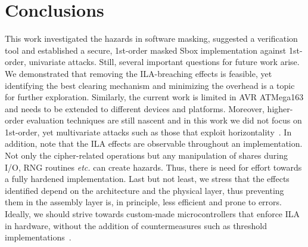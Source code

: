 \section{Conclusions} \label{sec:conclusions}

This work investigated the hazards in software masking, 
suggested a verification tool and established a secure, 
1st-order masked Sbox implementation against 1st-order, univariate attacks. 
Still, several important questions for future work arise. 
We demonstrated that removing the ILA-breaching effects is feasible, 
yet identifying the best clearing mechanism and minimizing the overhead is a topic for further exploration. 
Similarly, the current work is limited in AVR ATMega163 and needs to be 
extended to different devices and platforms. Moreover, higher-order evaluation 
techniques are still nascent and in this work we did not focus on 1st-order, 
yet multivariate attacks such as those that exploit horizontality~\cite{DBLP:conf/ches/BattistelloCPZ16}. 
In addition, note that the ILA effects are observable throughout an implementation. 
Not only the cipher-related operations but any manipulation of shares during I/O, RNG routines \emph{etc.} 
can create hazards. Thus, there is need for effort towards a fully hardened implementation. 
Last but not least, we stress that the effects identified depend on the architecture and the physical layer, 
thus preventing them in the assembly layer is, in principle, less efficient and prone to errors. 
Ideally, we should strive towards custom-made microcontrollers that enforce ILA in hardware, 
without the addition of countermeasures such as threshold implementations~\cite{DBLP:conf/icics/NikovaRR06}.  

